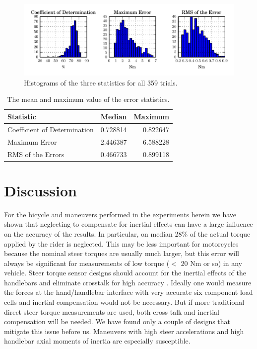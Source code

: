 \documentclass[a4paper]{article}
\begin{document}
\begin{figure}
  \label{fig:error-stats}
  \centering
  \caption{Histograms of the three statistics for all 359
    trials.}
  \includegraphics{figures/error-stats.pdf}
\end{figure}



\begin{table}
  \caption{The mean and maximum value of the error statistics.}
  \centering
  \begin{tabular}{lrr}
    \hline
    Statistic                    & Median   & Maximum \\
    \hline
    Coefficient of Determination & 0.728814 & 0.822647 \\
    Maximum Error                & 2.446387 & 6.588228 \\
    RMS of the Errors            & 0.466733 & 0.899118
  \end{tabular}
  \label{tab:medians}
\end{table}

\section*{Discussion}

For the bicycle and maneuvers performed in the experiments herein we have shown
that neglecting to compensate for inertial effects can have a large influence on the
accuracy of the results. In particular, on median 28\% of the actual
torque applied by the rider is neglected. This may be less important for
motorcycles because the nominal steer torques are usually much larger, but this
error will always be significant for measurements of low torque ($<$ 20 Nm or so)
in any vehicle. Steer torque sensor designs should account for the inertial
effects of the handlebars and eliminate crosstalk for high accuracy .
Ideally one would measure the forces at the hand/handlebar interface with very
accurate six component load cells and inertial compensation would not be
necessary. But if more traditional direct steer torque measurements are used,
both cross talk and inertial compensation will be needed. We have  found only a
couple of designs that mitigate this issue before us. Maneuvers with high steer
accelerations and high handlebar axial moments of inertia are especially
susceptible.
\end{document}
